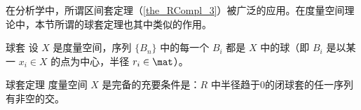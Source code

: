 在分析学中，所谓区间套定理（\autoref{the_RCompl_3}）被广泛的应用。在度量空间理论中，本节所谓的球套定理也其中类似的作用。


\begin{definition}{球套}
设 $X$ 是度量空间，序列 $\{B_n\}$ 中的每一个 $B_i$ 都是 $X$ 中的球（即 $B_i$ 是以某一 $x_i\in X$ 的点为中心，半径 $r_i\in\mat$）。
\end{definition}

\begin{theorem}{球套定理}
度量空间 $X$ 是完备的充要条件是：$R$ 中半径趋于0的闭球套的任一序列有非空的交。
\end{theorem}